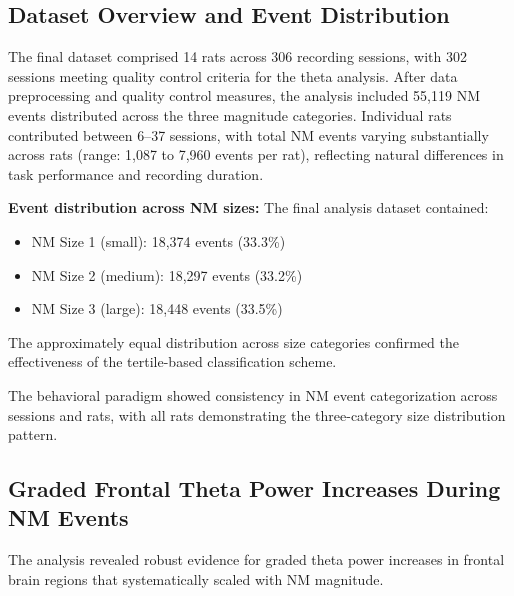 \documentclass[11pt]{article}
\begin{document}
\subsection{Dataset Overview and Event Distribution}

The final dataset comprised 14 rats across 306 recording sessions, with 302 sessions meeting quality control criteria for the theta analysis. After data preprocessing and quality control measures, the analysis included 55,119 NM events distributed across the three magnitude categories. Individual rats contributed between 6--37 sessions, with total NM events varying substantially across rats (range: 1,087 to 7,960 events per rat), reflecting natural differences in task performance and recording duration.

\textbf{Event distribution across NM sizes:} The final analysis dataset contained:
\begin{itemize}
\item NM Size 1 (small): 18,374 events (33.3\%)
\item NM Size 2 (medium): 18,297 events (33.2\%)
\item NM Size 3 (large): 18,448 events (33.5\%)
\end{itemize}

The approximately equal distribution across size categories confirmed the effectiveness of the tertile-based classification scheme.

The behavioral paradigm showed consistency in NM event categorization across sessions and rats, with all rats demonstrating the three-category size distribution pattern.

\subsection{Graded Frontal Theta Power Increases During NM Events}

The analysis revealed robust evidence for graded theta power increases in frontal brain regions that systematically scaled with NM magnitude.
\end{document}
